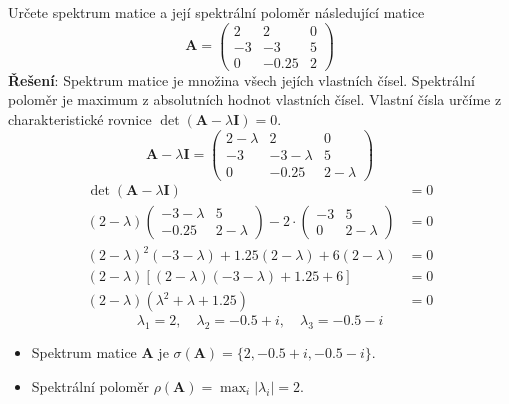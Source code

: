 

\begin{example}\label{mai:exam013}
  Určete spektrum matice a její spektrální poloměr následující matice
    \begin{equation*}\label{pr:spektrum_matice}
      \mathbf{A} =
        \begin{pmatrix}
          2  &  2    & 0 \\
         -3  & -3    & 5 \\
          0  & -0.25 & 2
        \end{pmatrix}
    \end{equation*}
  \textbf{Řešení}: Spektrum matice je množina všech jejích vlastních čísel. Spektrální poloměr 
  je maximum z absolutních hodnot vlastních čísel. Vlastní čísla určíme z charakteristické
  rovnice \(\det(\mathbf{A}-\lambda \mathbf{I})=0\).
    \begin{equation*}
      \textbf{A} - \lambda\textbf{I}=
        \begin{pmatrix}
          2-\lambda  &  2          & 0 \\
         -3          & -3-\lambda  & 5 \\
          0          & -0.25       & 2-\lambda
       \end{pmatrix}
    \end{equation*}
    \begin{align}
      \det(\mathbf{A}-\lambda \mathbf{I})                    &= 0           \nonumber\\
      (2-\lambda)
        \begin{pmatrix}
          -3-\lambda  &  5\\
             -0.25    &  2 - \lambda
        \end{pmatrix} -2\cdot
        \begin{pmatrix}
          -3       &  5\\
           0       &  2 - \lambda
        \end{pmatrix}                                        &= 0           \nonumber\\
      (2-\lambda)^2(-3-\lambda)+1.25(2-\lambda)+6(2-\lambda) &= 0           \nonumber\\
      (2-\lambda)[(2-\lambda)(-3-\lambda)+1.25+6]            &= 0           \nonumber\\
      (2-\lambda)(\lambda^2+\lambda+1.25)                    &= 0           \nonumber
    \end{align}
    \begin{equation*}
      \lambda_1 = 2, \quad\lambda_2 = -0.5+i, \quad\lambda_3=-0.5-i
    \end{equation*}
    \begin{itemize}
      \item Spektrum matice \(\mathbf{A}\) je \(\sigma(\mathbf{A})=\{2,-0.5+i,-0.5-i\}\).
      \item Spektrální poloměr \(\rho(\mathbf{A})=\max_i|\lambda_i|=2\).
    \end{itemize}


\end{example}